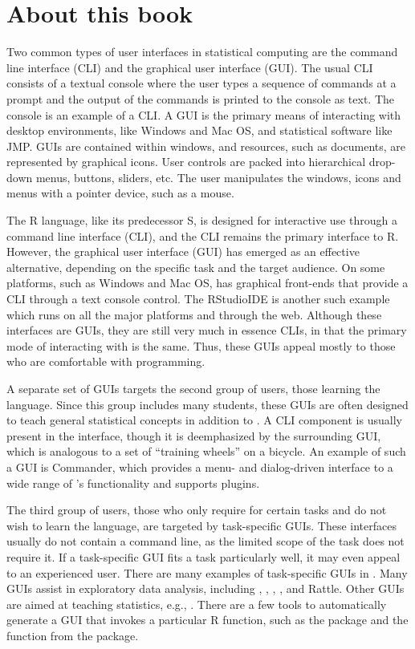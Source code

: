 


\section*{About this book}
\label{sec:about}

Two common types of user interfaces in statistical computing are the
command line interface (CLI) and the graphical user interface
(GUI). The usual CLI consists of a textual console where the user
types a sequence of commands at a prompt and the output of the
commands is printed to the console as text. The  console
is an example of a CLI. A GUI is the primary means of interacting with
desktop environments, like Windows and Mac OS, and statistical
software like JMP. GUIs are contained within windows, and
resources, such as documents, are represented by graphical icons.
User controls are packed into hierarchical drop-down menus, buttons,
sliders, etc. The user manipulates the windows, icons and menus with a
pointer device, such as a mouse.

The R language, like its predecessor S, is designed for interactive
use through a command line interface (CLI), and the CLI remains the
primary interface to R. However, the graphical user interface (GUI)
has emerged as an effective alternative, depending on the specific
task and the target audience.  On some platforms, such as Windows and
Mac OS, \R{} has graphical front-ends that provide a CLI through a
text console control. The RStudio\texttrademark IDE is another such
example which runs on all the major platforms and through the
web. Although these interfaces are GUIs, they are still very much in
essence CLIs, in that the primary mode of interacting with
 is the same. Thus, these GUIs appeal mostly to those who
are comfortable with  programming.

A separate set of GUIs targets the second group of users, those
learning the  language. Since this group includes many
students, these GUIs are often designed to teach general statistical
concepts in addition to .  A CLI component is usually
present in the interface, though it is deemphasized by the surrounding
GUI, which is analogous to a set of ``training wheels'' on a
bicycle. An example of such a GUI is  Commander, which provides a menu- and dialog-driven interface to a
wide range of \R's functionality and supports plugins.

The third group of users, those who only require  for
certain tasks and do not wish to learn the language, are targeted by
task-specific GUIs. These interfaces usually do not contain a command
line, as the limited scope of the task does not require it. If a
task-specific GUI fits a task particularly well, it may even appeal to
an experienced user. There are many examples of task-specific GUIs in
. Many GUIs assist in exploratory data analysis, including
, ,
, , and Rattle.  Other
GUIs are aimed at teaching statistics, e.g.,
. There are a few tools to automatically generate a
GUI that invokes a particular R function, such as the 
package and the  function from the
 package.

